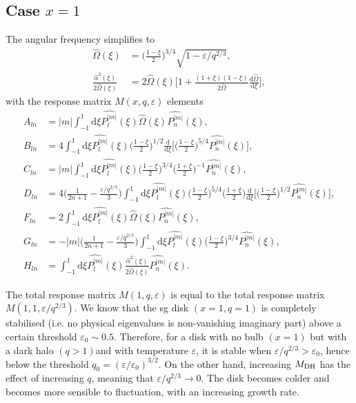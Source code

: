 \documentclass[11pt]{article}
\newcommand{\rd}{\mathrm{d}}
\newcommand{\Mdh}{M_{\rm{DH}}}
\newcommand{\Pnm}{P_n^{|m|}}
\newcommand{\Plm}{P_l^{|m|}}
\newcommand{\hPnm}{\widehat{\Pnm}}
\newcommand{\hPlm}{\widehat{\Plm}}
\newcommand{\hOmega}{\widehat{\Omega}}
\newcommand{\halpha}{\widehat{\alpha}}
\begin{document}
\subsection{Case $x=1$}

The angular frequency simplifies to
\begin{align*}
\hOmega(\xi) &=\bigg(\frac{1-\xi}{2}\bigg)^{3/4}  \sqrt{1- \varepsilon/q^{2/3} } , \\
\frac{\halpha^2(\xi)}{2\hOmega(\xi)} & = 2\hOmega(\xi) \bigg[1+\frac{(1+\xi)(1-\xi)}{2\hOmega}\frac{\rd \hOmega }{\rd \xi} \bigg],
\end{align*}
with the response matrix $M(x,q,\varepsilon)$ elements
\begin{align*}
A_{ln} &= |m| \int_{-1}^{1} \rd \xi  \hPlm(\xi)\hOmega(\xi)\hPnm(\xi) , \\
B_{ln} &= 4 \int_{-1}^{1} \rd \xi  \hPlm(\xi) \bigg(\frac{1-\xi}{2}\bigg)^{1/2} \frac{\rd}{\rd \xi} \bigg[\bigg(\frac{1-\xi}{2}\bigg)^{5/4}\hPnm(\xi)\bigg], \\
C_{ln} &= |m| \int_{-1}^{1} \rd \xi \hPlm(\xi) \bigg(\frac{1-\xi}{2}\bigg)^{3/4}\bigg(\frac{1+\xi}{2}\bigg)^{-1}   \hPnm(\xi), \\
D_{ln} &= 4 \bigg(\frac{1}{2n+1}-\frac{\varepsilon/q^{2/3}}{3}  \bigg) \int_{-1}^{1} \rd \xi \hPlm(\xi)  \bigg(\frac{1-\xi}{2}\bigg)^{5/4} \bigg(\frac{1+\xi}{2}\bigg) 
\frac{\rd}{\rd \xi} \bigg[ \bigg(\frac{1-\xi}{2}\bigg)^{1/2}\hPnm(\xi) \bigg] ,\\
F_{ln} &=2 \int_{-1}^{1} \rd \xi  \hPlm(\xi)\hOmega(\xi)\hPnm(\xi) , \\
G_{ln} &= -|m| \bigg(\frac{1}{2n+1}-\frac{\varepsilon/q^{2/3}}{3} \bigg)  \int_{-1}^{1} \rd \xi \hPlm(\xi)  \bigg(\frac{1-\xi}{2}\bigg)^{3/4} 
\hPnm(\xi)  ,\\
H_{ln} &=  \int_{-1}^{1} \rd \xi  \hPlm(\xi)\frac{\halpha^2(\xi)}{2\hOmega(\xi)}\hPnm(\xi) .
\end{align*}

The total response matrix $M(1,q,\varepsilon)$ is equal to the total response matrix $M(1,1,\varepsilon/q^{2/3})$. We know that the sg disk $(x=1,q=1)$ is completely stabilised (i.e. no physical eigenvalues is non-vanishing imaginary part) above a certain threshold $\varepsilon_0 \sim 0.5$. Therefore, for a disk with no bulb $(x=1)$ but with a dark halo $(q>1)$and with temperature $\varepsilon$, it is stable when $\varepsilon/q^{2/3} > \varepsilon_0$, hence below the threshold $q_0 = (\varepsilon/\varepsilon_0)^{3/2}$.
On the other hand, increasing $\Mdh$ has the effect of increasing $q$, meaning that $\varepsilon/q^{2/3} \rightarrow 0$. The disk becomes colder and becomes more sensible to fluctuation, with an increasing growth rate.
\end{document}
